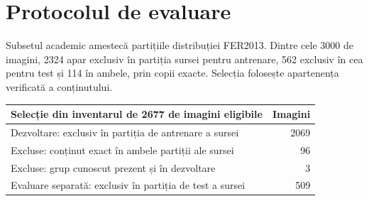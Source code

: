 \documentclass[10pt,a4paper]{article}
\begin{document}
\section{Protocolul de evaluare}
Subsetul academic amestecă partițiile distribuției FER2013. Dintre cele 3000
de imagini, 2324 apar exclusiv în partiția sursei pentru antrenare, 562
exclusiv în cea pentru test și 114 în ambele, prin copii exacte. Selecția
folosește apartenența verificată a conținutului.
\begin{center}
\begin{tabular}{lr}\toprule
Selecție din inventarul de 2677 de imagini eligibile & Imagini \\\midrule
Dezvoltare: exclusiv în partiția de antrenare a sursei & 2069 \\
Excluse: conținut exact în ambele partiții ale sursei & 96 \\
Excluse: grup cunoscut prezent și în dezvoltare & 3 \\
Evaluare separată: exclusiv în partiția de test a sursei & 509 \\\bottomrule
\end{tabular}
\end{center}
\end{document}
